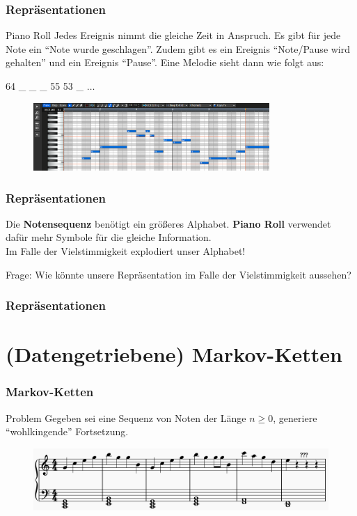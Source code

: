 \documentclass[aspectratio=169]{beamer}
\begin{document}
\begin{frame}
	\frametitle{Repräsentationen}
	
	\begin{block}{Piano Roll}
		Jedes Ereignis nimmt die gleiche Zeit in Anspruch. Es gibt für jede Note ein ``Note wurde geschlagen''.
		Zudem gibt es ein Ereignis ``Note/Pause wird gehalten'' und ein Ereignis ``Pause''.
		Eine Melodie sieht dann wie folgt aus:
		\begin{center}
			64 \_ \_ \_ 55 53 \_ $\ldots$
		\end{center}
	\end{block}
	
	\begin{figure}
		\includegraphics[width=0.8\textwidth]{piano-roll-notation}
	\end{figure}
\end{frame}

\begin{frame}
	\frametitle{Repräsentationen}
	Die \textbf{Notensequenz} benötigt ein größeres Alphabet. \textbf{Piano Roll} verwendet dafür mehr Symbole für die gleiche Information.\\
	\vspace{1cm}
	Im Falle der Vielstimmigkeit explodiert unser Alphabet!\\
	\vspace{1cm}
	\begin{block}{Frage:}
		Wie könnte unsere Repräsentation im Falle der Vielstimmigkeit aussehen?
	\end{block}
\end{frame}

\begin{frame}
	\frametitle{Repräsentationen}

\end{frame}

\section{(Datengetriebene) Markov-Ketten}

\begin{frame}
	\frametitle{Markov-Ketten}
	\begin{block}{Problem}
		Gegeben sei eine Sequenz von Noten der Länge $n \geq 0$, generiere ``wohlkingende'' Fortsetzung.
	\end{block}
	\begin{figure}
		\includegraphics[width=\textwidth]{notes}
	\end{figure}
\end{frame}
\end{document}

